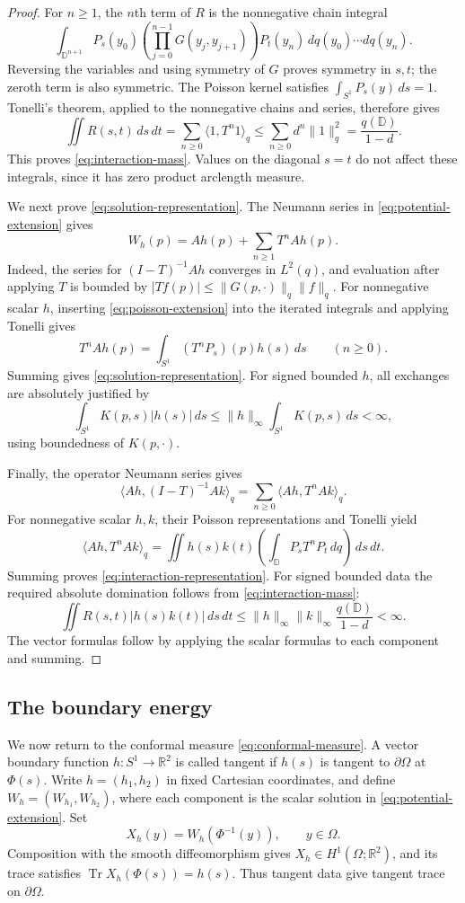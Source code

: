 \begin{proof}
For $n\ge1$, the $n$th term of $R$ is the nonnegative chain integral
\[
 \int_{\mathbb D^{n+1}}
 P_s(y_0)\left(\prod_{j=0}^{n-1}G(y_j,y_{j+1})\right)
 P_t(y_n)\,dq(y_0)\cdots dq(y_n).
\]
Reversing the variables and using symmetry of $G$ proves symmetry
in $s,t$; the zeroth term is also symmetric.
The Poisson kernel satisfies $\int_{S^1}P_s(y)\,ds=1$.
Tonelli's theorem, applied to the nonnegative chains and series,
therefore gives
\[
 \iint R(s,t)\,ds\,dt
 =\sum_{n\ge0}\langle1,T^n1\rangle_q
 \le\sum_{n\ge0}d^n\|1\|_q^2
 =\frac{q(\mathbb D)}{1-d}.
\]
This proves \cref{eq:interaction-mass}. Values on the diagonal
$s=t$ do not affect these integrals, since it has zero product
arclength measure.

We next prove \cref{eq:solution-representation}. The Neumann series
in \cref{eq:potential-extension} gives
\[
 W_h(p)=Ah(p)+\sum_{n\ge1}T^nAh(p).
\]
Indeed, the series for $(I-T)^{-1}Ah$ converges in $L^2(q)$,
and evaluation after applying $T$ is bounded by
$|Tf(p)|\le\|G(p,\cdot)\|_q\|f\|_q$.
For nonnegative scalar $h$, inserting \cref{eq:poisson-extension}
into the iterated integrals and applying Tonelli gives
\[
 T^nAh(p)=\int_{S^1}(T^nP_s)(p)h(s)\,ds
 \qquad(n\ge0).
\]
Summing gives \cref{eq:solution-representation}.
For signed bounded $h$, all exchanges are absolutely justified by
\[
 \int_{S^1}K(p,s)|h(s)|\,ds
 \le\|h\|_\infty\int_{S^1}K(p,s)\,ds<\infty,
\]
using boundedness of $K(p,\cdot)$.

Finally, the operator Neumann series gives
\[
 \langle Ah,(I-T)^{-1}Ak\rangle_q
 =\sum_{n\ge0}\langle Ah,T^nAk\rangle_q.
\]
For nonnegative scalar $h,k$, their Poisson representations and
Tonelli yield
\[
 \langle Ah,T^nAk\rangle_q
 =\iint h(s)k(t)
      \left(\int_{\mathbb D}P_sT^nP_t\,dq\right)\,ds\,dt.
\]
Summing proves \cref{eq:interaction-representation}. For signed
bounded data the required absolute domination follows from
\cref{eq:interaction-mass}:
\[
 \iint R(s,t)|h(s)k(t)|\,ds\,dt
 \le\|h\|_\infty\|k\|_\infty\frac{q(\mathbb D)}{1-d}<\infty.
\]
The vector formulas follow by applying the scalar formulas to each
component and summing.
\end{proof}

\subsection{The boundary energy}

We now return to the conformal measure \cref{eq:conformal-measure}.
A vector boundary function $h:S^1\to\mathbb R^2$ is called tangent
if $h(s)$ is tangent to $\partial\Omega$ at $\Phi(s)$.
Write $h=(h_1,h_2)$ in fixed Cartesian coordinates, and define
$W_h=(W_{h_1},W_{h_2})$, where each component is the scalar solution
in \cref{eq:potential-extension}. Set
\[
 X_h(y)=W_h(\Phi^{-1}(y)),\qquad y\in\Omega.
\]
Composition with the smooth diffeomorphism gives
$X_h\in H^1(\Omega;\mathbb R^2)$, and its trace satisfies
$\operatorname{Tr}X_h(\Phi(s))=h(s)$. Thus tangent data give tangent
trace on $\partial\Omega$.

